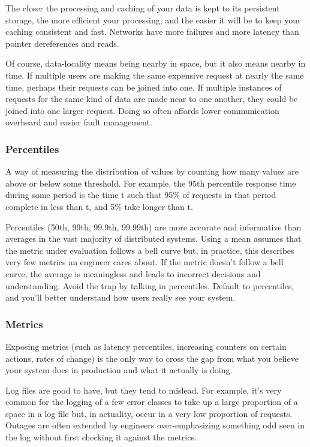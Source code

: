 \documentclass{article}
\begin{document}
    The closer the processing and caching of your data is kept to its persistent storage, the more efficient your processing, and the easier it will be to keep your caching consistent and fast. Networks have more failures and more latency than pointer dereferences and reads.
    
    Of course, data-locality means being nearby in space, but it also means nearby in time. If multiple users are making the same expensive request at nearly the same time, perhaps their requests can be joined into one. If multiple instances of requests for the same kind of data are made near to one another, they could be joined into one larger request. Doing so often affords lower communication overheard and easier fault management.
    
    \subsubsection{Percentiles}
    A way of measuring the distribution of values by counting how many values are above or below some threshold. For example, the 95th percentile response time during some period is the time t such that 95\% of requests in that period complete in less than t, and 5\% take longer than t.
    
    Percentiles (50th, 99th, 99.9th, 99.99th) are more accurate and informative than averages in the vast majority of distributed systems. Using a mean assumes that the metric under evaluation follows a bell curve but, in practice, this describes very few metrics an engineer cares about. If the metric doesn’t follow a bell curve, the average is meaningless and leads to incorrect decisions and understanding. Avoid the trap by talking in percentiles. Default to percentiles, and you’ll better understand how users really see your system.
    
    \subsubsection{Metrics}
    Exposing metrics (such as latency percentiles, increasing counters on certain actions, rates of change) is the only way to cross the gap from what you believe your system does in production and what it actually is doing. 
    
    Log files are good to have, but they tend to mislead. For example, it’s very common for the logging of a few error classes to take up a large proportion of a space in a log file but, in actuality, occur in a very low proportion of requests. Outages are often extended by engineers over-emphasizing something odd seen in the log without first checking it against the metrics.
    
\end{document}
